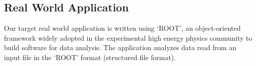 
\subsection{Real World Application}
\label{subsec: application}
Our target real world application is written using `ROOT', an object-oriented framework widely adopted in the experimental high energy physics community to build software for data analysis. The application analyzes data read from an input file in the `ROOT' format (structured file format). %

